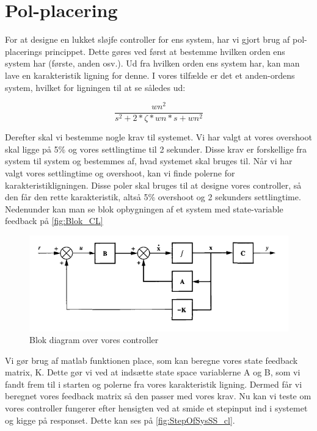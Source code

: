 \graphicspath{{Chapters/Pol-placering/}}

\section{Pol-placering}
For at designe en lukket sløjfe controller for ens system, har vi gjort brug af pol-placerings princippet. Dette gøres ved først at bestemme hvilken orden ens system har (første, anden osv.). Ud fra hvilken orden ens system har, kan man lave en karakteristik ligning for denne. I vores tilfælde er det et anden-ordens system, hvilket for ligningen til at se således ud:

\begin{equation}
 \frac{wn^2}{s^2+2*\zeta*wn*s+wn^2}
\end{equation}


Derefter skal vi bestemme nogle krav til systemet. Vi har valgt at vores overshoot skal ligge på 5\% og vores settlingtime til 2 sekunder. Disse krav er forskellige fra system til system og bestemmes af, hvad systemet skal bruges til. Når vi har valgt vores settlingtime og overshoot, kan vi finde polerne for karakteristikligningen. Disse poler skal bruges til at designe vores controller, så den får den rette karakteristik, altså 5\% overshoot og 2 sekunders settlingtime. Nedenunder kan man se blok opbygningen af et system med state-variable feedback på \autoref{fig:Blok_CL}

\begin{figure}[H]
	\centering
	\includegraphics[width = 400pt]{Img/Controller_blok.png}
	\caption{Blok diagram over vores controller}
	\label{fig:Blok_CL}
\end{figure}

Vi gør brug af matlab funktionen place, som kan beregne vores state feedback matrix, K. Dette gør vi ved at indsætte state space variablerne A og B, som vi fandt frem til i starten og polerne fra vores karakteristik ligning. Dermed får vi beregnet vores feedback matrix så den passer med vores krav.
Nu kan vi teste om vores controller fungerer efter hensigten ved at smide et stepinput ind i systemet og kigge på responset. Dette kan ses på \autoref{fig:StepOfSysSS_cl}.  

